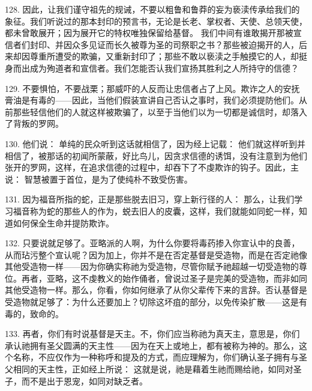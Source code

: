 128. 因此，让我们谨守祖先的规诫，不要以粗鲁和鲁莽的妄为亵渎传承给我们的象征。我们听说过的那本封印的预言书，无论是长老、掌权者、天使、总领天使，都未曾敢展开；因为展开它的特权唯独保留给基督。 我们中间有谁敢揭开那被宣信者们封印、并因众多见证而长久被尊为圣的司祭职之书？那些被迫揭开的人，后来却因尊重所遭受的欺骗，又重新封印了；那些不敢以亵渎之手触摸它的人，却挺身而出成为殉道者和宣信者。我们怎能否认我们宣扬其胜利之人所持守的信德？\par

\par

129. 不要惧怕，不要战栗；那威吓的人反而让忠信者占了上风。欺诈之人的安抚膏油是有毒的——因此，当他们假装宣讲自己否认之事时，我们必须提防他们。从前那些轻信他们的人就这样被欺骗了，以至于当他们以为一切都是诚信时，却落入了背叛的罗网。\par

130. 他们说： 单纯的民众听到这话就相信了，因为经上记载：  他们就这样听到并相信了，被那话的初闻所蒙蔽，好比鸟儿，因贪求信德的诱饵，没有注意到为他们张开的罗网，这样，在追求信德的过程中，却吞下了不虔欺诈的钩子。因此，主说：  智慧被置于首位，是为了使纯朴不致受伤害。\par

131. 因为福音所指的蛇，正是那些脱去旧习，穿上新行径的人：  那么，让我们学习福音称为蛇的那些人的作为，蜕去旧人的皮囊，这样，我们就能如同蛇一样，知道如何保全生命并提防欺诈。\par

132. 只要说就足够了。亚略派的人啊，为什么你要将毒药掺入你宣认中的良善，从而玷污整个宣认呢？因为加上，你并不是在否定基督是受造物，而是在否定祂像其他受造物一样——因为你确实称祂为受造物，尽管你赋予祂超越一切受造物的尊位。再者，亚略，这不虔教义的始作俑者，曾说过圣子是完美的受造物，而非如同其他受造物一样。那么，你看，你如何继承了从你父辈传下来的言辞。否认基督是受造物就足够了：为什么还要加上？切除这坏疽的部分，以免传染扩散——这是有毒的，致命的。\par

133. 再者，你们有时说基督是天主。不，你们应当称祂为真天主，意思是，你们承认祂拥有圣父圆满的天主性——因为在天上或地上，都有被称为神的。那么，这个名称，不应仅作为一种称呼和提及的方式，而应理解为，你们确认圣子拥有与圣父相同的天主性，正如经上所说：  这就是说，祂是藉着生祂而赐给祂，如同对圣子，而不是出于恩宠，如同对缺乏者。\par

